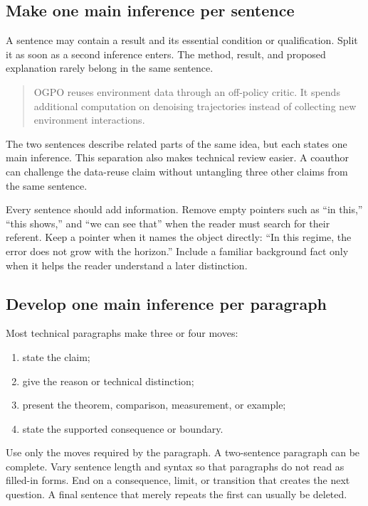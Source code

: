 \subsection{Make one main inference per sentence}

A sentence may contain a result and its essential condition or qualification.
Split it as soon as a second inference enters. The method, result, and proposed
explanation rarely belong in the same sentence.

\begin{quote}
OGPO reuses environment data through an off-policy critic. It spends additional
computation on denoising trajectories instead of collecting new environment
interactions.
\end{quote}

The two sentences describe related parts of the same idea, but each states one
main inference. This separation also makes technical review easier. A coauthor
can challenge the data-reuse claim without untangling three other claims from
the same sentence.

Every sentence should add information. Remove empty pointers such as ``in
this,'' ``this shows,'' and ``we can see that'' when the reader must search for
their referent. Keep a pointer when it names the object directly: ``In this
regime, the error does not grow with the horizon.'' Include a familiar
background fact only when it helps the reader understand a later distinction.

\subsection{Develop one main inference per paragraph}

Most technical paragraphs make three or four moves:

\begin{enumerate}[leftmargin=*]
    \item state the claim;
    \item give the reason or technical distinction;
    \item present the theorem, comparison, measurement, or example;
    \item state the supported consequence or boundary.
\end{enumerate}

Use only the moves required by the paragraph. A two-sentence paragraph can be
complete. Vary sentence length and syntax so that paragraphs do not read as
filled-in forms. End on a consequence, limit, or transition that creates the
next question. A final sentence that merely repeats the first can usually be
deleted.

